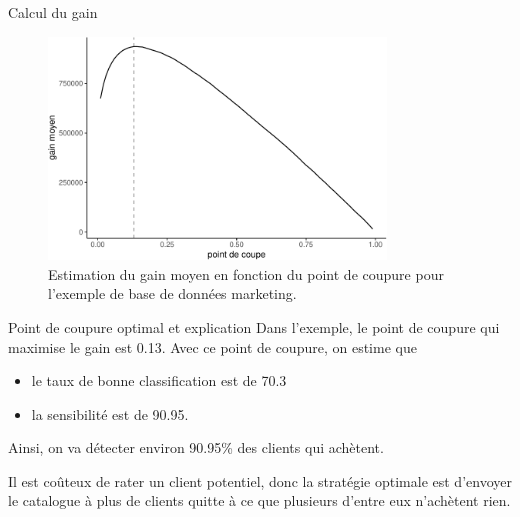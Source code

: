 \documentclass[
  ignorenonframetext,
]{beamer}
\providecommand{\tightlist}{%
  \setlength{\itemsep}{0pt}\setlength{\parskip}{0pt}}\usepackage{longtable,booktabs,array}
\begin{document}
\begin{frame}{Calcul du gain}
\protect\hypertarget{calcul-du-gain}{}
\begin{figure}

{\centering \includegraphics[width=0.8\textwidth,height=\textheight]{MATH60602-diapos7_files/figure-beamer/fig-coupure-pondere-1.pdf}

}

\caption{\label{fig-coupure-pondere}Estimation du gain moyen en fonction
du point de coupure pour l'exemple de base de données marketing.}

\end{figure}
\end{frame}

\begin{frame}{Point de coupure optimal et explication}
\protect\hypertarget{point-de-coupure-optimal-et-explication}{}
Dans l'exemple, le point de coupure qui maximise le gain est 0.13. Avec
ce point de coupure, on estime que

\begin{itemize}
\tightlist
\item
  le taux de bonne classification est de 70.3
\item
  la sensibilité est de 90.95.
\end{itemize}

Ainsi, on va détecter environ 90.95\% des clients qui achètent.

Il est coûteux de rater un client potentiel, donc la stratégie optimale
est d'envoyer le catalogue à plus de clients quitte à ce que plusieurs
d'entre eux n'achètent rien.
\end{frame}
\end{document}
